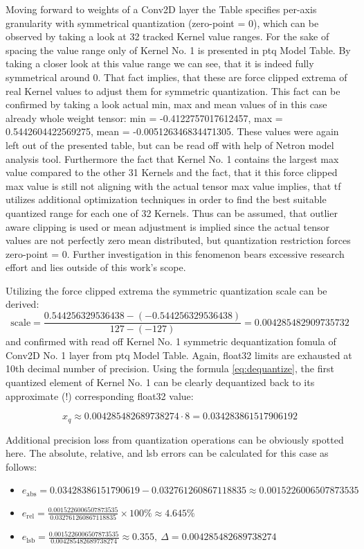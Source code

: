 {Moving forward to weights of a Conv2D layer the Table specifies per-axis granularity with symmetrical quantization (zero-point = 0),
which can be observed by taking a look at 32 tracked Kernel value ranges. For the sake of spacing the value range only of Kernel No. 1 is presented in \gls{ptq} Model Table.
By taking a closer look at this value range we can see, that it is indeed fully symmetrical around 0.
That fact implies, that these are force clipped extrema of real Kernel values to adjust them for symmetric quantization.
This fact can be confirmed by taking a look actual min, max and mean values of in this case already whole weight tensor:
min = -0.4122757017612457, max = 0.5442604422569275, mean = -0.005126346834471305.
These values were again left out of the presented table, but can be read off with help of Netron model analysis tool. 
Furthermore the fact that Kernel No. 1 contains the largest max value compared to the other 31 Kernels and the fact,
that it this force clipped max value is still not aligning with the actual tensor max value implies,
that \gls{tf} utilizes additional optimization techniques in order to find the best suitable quantized range for each one of 32 Kernels.
Thus can be assumed, that outlier aware clipping is used or mean adjustment is implied since the actual tensor values are not perfectly zero mean distributed,
but quantization restriction forces zero-point = 0.
Further investigation in this fenomenon bears excessive research effort and lies outside of this work's scope.

Utilizing the force clipped extrema the symmetric quantization scale can be derived:
\begin{equation*}
\text{scale} = \frac{0.544256329536438 - (-0.544256329536438)}{127 - (-127)} = 0.004285482909735732
\end{equation*}
and confirmed with read off Kernel No. 1 symmetric dequantization fomula of Conv2D No. 1 layer from \gls{ptq} Model Table.
Again, \gls{float32} limits are exhausted at 10th decimal number of precision.
Using the formula \ref{eq:dequantize}, the first quantized element of Kernel No. 1 can be clearly dequantized back to its approximate (!) corresponding \gls{float32} value:

\begin{equation*}
x_{q} \approx 0.004285482689738274 \cdot 8 = 0.034283861517906192
\end{equation*}

Additional precision loss from quantization operations can be obviously spotted here. The absolute, relative, and \gls{lsb} errors
can be calculated for this case as follows:
\begin{itemize}
    \item $e_{\text{abs}} = 0.03428386151790619 - 0.032761260867118835 \approx 0.0015226006507873535$
    \item $e_{\text{rel}} = \frac{0.0015226006507873535}{0.032761260867118835} \times 100\% \approx 4.645\%$
    \item $e_{\text{lsb}} = \frac{0.0015226006507873535}{0.004285482689738274} \approx 0.355,\ \Delta = 0.004285482689738274$
\end{itemize}

}
